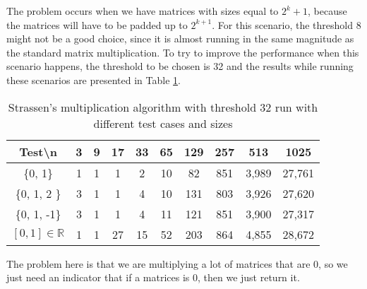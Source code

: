 \documentclass[tikz, 12pt]{scrartcl}
\begin{document}
The problem occurs when we have matrices with sizes equal to $2^k + 1$, because the matrices will have to be padded up to $2^{k+1}$. For this scenario, the threshold 8 might not be a good choice, since it is almost running in the same magnitude as the standard matrix multiplication. To try to improve the performance when this scenario happens, the threshold to be chosen is 32 and the results while running these scenarios are presented in Table \ref{strassenPaddingOdd}.

\begin{table}[h!]
\caption{Strassen's multiplication algorithm with threshold 32 run with different test cases and sizes\label{strassenPaddingOdd}}
\centering
\begin{tabular}{|c|ccccccccc|}
\hline
Test\textbackslash  n		&	3	&	9	&	17	&	33	&	65	&	129	&	257		&	513		&	1025\\
\hline
\{0, 1\}				&	1	&	1	&	1	&	2	&	10	&	82	&	851		&	3,989	&	27,761\\
\{0, 1, 2 \}				&	3	&	1	&	1	&	4	&	10	&	131	&	803		&	3,926	&	27,620\\
\{0, 1, -1\}				&	3	&	1	&	1	&	4	&	11	&	121	&	851		&	3,900	&	27,317\\
$[0, 1] \in \mathbb{R}$	&	1	&	1	&	27	&	15	&	52	&	203	&	864		&	4,855	&	28,672\\
\hline
\end{tabular}
\end{table}

The problem here is that we are multiplying a lot of matrices that are $0$, so we just need an indicator that if a matrices is 0, then we just return it.
\end{document}
